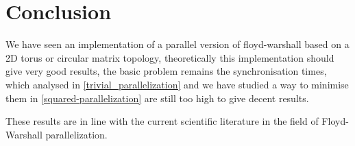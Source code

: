 \section{Conclusion}
We have seen an implementation of a parallel version of floyd-warshall based on a 2D torus or circular matrix topology, theoretically this implementation should give very good results, the basic problem remains the synchronisation times, which analysed in \cref{trivial_parallelization} and we have studied a way to minimise them in \cref{squared-parallelization} are still too high to give decent results.

These results are in line with the current scientific literature in the field of  Floyd-Warshall parallelization.

\FloatBarrier